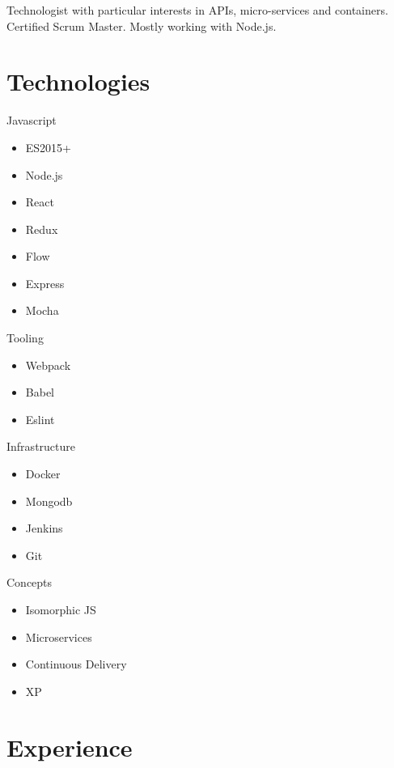 \documentclass[10pt,a4paper,sans]{moderncv}
\date{11/08/2018}
\begin{document}
\makecvtitle

Technologist with particular interests in APIs, micro-services and containers. Certified Scrum Master. Mostly working with Node.js.

\section{Technologies}

\begin{cvcolumns}
  \cvcolumn
    {Javascript}
    {
      \begin{itemize}
        \item ES2015+
        \item Node.js
        \item React
        \item Redux
        \item Flow
        \item Express
        \item Mocha
      \end{itemize}
    }

  \cvcolumn
    {Tooling}
    {
      \begin{itemize}
        \item Webpack
        \item Babel
        \item Eslint
      \end{itemize}
    }

  \cvcolumn
    {Infrastructure}
    {
      \begin{itemize}
        \item Docker
        \item Mongodb
        \item Jenkins
        \item Git
      \end{itemize}
    }

  \cvcolumn
    {Concepts}
    {
      \begin{itemize}
        \item Isomorphic JS
        \item Microservices
        \item Continuous Delivery
        \item XP
      \end{itemize}
    }
\end{cvcolumns}

\section{Experience}
\end{document}
